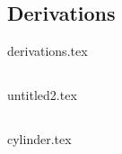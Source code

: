 \documentclass[UKenglish]{texmex/uiomasterthesis}
\begin{document}
















\backmatter{}


\part*{}






\appendix






\chapter{Derivations}\label{app:derivations}
    {{derivations.tex}}


\chapter{}\label{app:untitled2}
    {{untitled2.tex}}


\chapter{}\label{app:special}
    {{cylinder.tex}}

    





\end{document}
